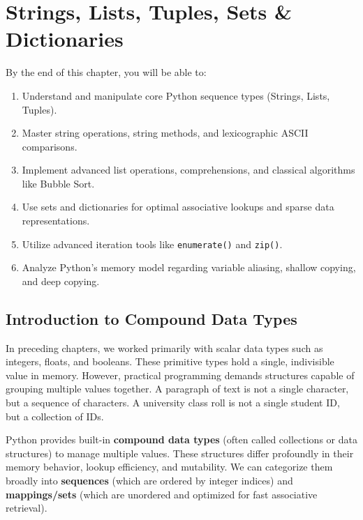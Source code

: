 \chapter{Strings, Lists, Tuples, Sets \& Dictionaries}
\label{ch:strings_lists_tuples_dicts}

\begin{tcolorbox}[
    enhanced,
    colback=boxnavybg,
    colframe=brandnavy,
    boxrule=1pt,
    arc=4pt,
    title={\Large\bfseries\sffamily Chapter Learning Objectives}
]
\sffamily
By the end of this chapter, you will be able to:
\begin{enumerate}
    \item Understand and manipulate core Python sequence types (Strings, Lists, Tuples).
    \item Master string operations, string methods, and lexicographic ASCII comparisons.
    \item Implement advanced list operations, comprehensions, and classical algorithms like Bubble Sort.
    \item Use sets and dictionaries for optimal associative lookups and sparse data representations.
    \item Utilize advanced iteration tools like \texttt{enumerate()} and \texttt{zip()}.
    \item Analyze Python's memory model regarding variable aliasing, shallow copying, and deep copying.
\end{enumerate}
\end{tcolorbox}

\section{Introduction to Compound Data Types}

In preceding chapters, we worked primarily with scalar data types such as integers, floats, and booleans. These primitive types hold a single, indivisible value in memory. However, practical programming demands structures capable of grouping multiple values together. A paragraph of text is not a single character, but a sequence of characters. A university class roll is not a single student ID, but a collection of IDs.

Python provides built-in \textbf{compound data types} (often called collections or data structures) to manage multiple values. These structures differ profoundly in their memory behavior, lookup efficiency, and mutability. We can categorize them broadly into \textbf{sequences} (which are ordered by integer indices) and \textbf{mappings/sets} (which are unordered and optimized for fast associative retrieval). 

